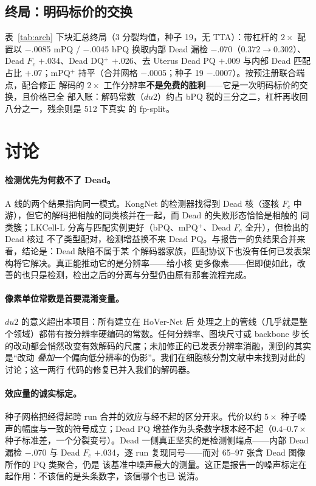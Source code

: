 \documentclass[11pt]{article}
\begin{document}
\subsection{终局：明码标价的交换}
\label{sec:final}

表~\ref{tab:arch} 下块汇总终局（3 分裂均值，种子 19，无 TTA）：带杠杆的 $2\times$ 配置以
$-$.0085 mPQ / $-$.0045 bPQ 换取内部 Dead 漏检 $-$.070（$0.372\!\to\!0.302$）、Dead
$F_c$ $+$.034、Dead DQ$^+$ $+$.026、去 Uterus Dead PQ $+$.009 与内部 Dead 匹配占比
$+$.07；mPQ$^+$ 持平（合并网格 $-$.0005；种子 19 $-$.0007）。按预注册联合端点，配合修正
解码的 $2\times$ 工作分辨率\textbf{不是免费的胜利}——它是一次明码标价的交换，且价格已全
部入账：解码常数（$du2$）约占 bPQ 税的三分之二，杠杆再收回八分之一，残余则是 512 下真实
的 fp-split。

\section{讨论}
\label{sec:discussion}

\paragraph{检测优先为何救不了 Dead。}A 线的两个结果指向同一模式。KongNet 的检测器找得到 Dead
核（逐核 $F_c$ 中游），但它的解码把相触的同类核并在一起，而 Dead 的失败形态恰恰是相触的
同类簇；LKCell-L 分离与匹配实例更好（bPQ、mPQ$^+$、Dead $F_c$ 全升），但检出的 Dead 核过
不了类型配对，检测增益换不来 Dead PQ。与报告一的负结果合并来看，结论是：Dead 缺陷不属于某
个解码器家族，匹配协议下也没有任何已发表架构将它解决。真正能推动它的是分辨率——给小核
更多像素——但即便如此，改善的也只是检测，检出之后的分离与分型仍由原有那套流程完成。

\paragraph{像素单位常数是首要混淆变量。}$du2$ 的意义超出本项目：所有建立在 HoVer-Net 后
处理之上的管线（几乎就是整个领域）都带有按分辨率硬编码的常数。任何分辨率、图块尺寸或
backbone 步长的改动都会悄然改变有效解码的尺度；未加修正的已发表分辨率消融，测到的其实是“改动
\emph{叠加}一个偏向低分辨率的伪影”。我们在细胞核分割文献中未找到对此的讨论；这一两行
代码的修复已并入我们的解码器。

\paragraph{效应量的诚实标定。}种子网格把经得起跨 run 合并的效应与经不起的区分开来。代价以约
$5\times$ 种子噪声的幅度与一致的符号成立；Dead PQ 增益作为头条数字根本经不起（$0.4$--$0.7\times$
种子标准差，一个分裂变号）。Dead 一侧真正坚实的是检测侧端点——内部 Dead 漏检 $-$.070
与 Dead $F_c$ $+$.034，逐 run 复现同号——而对 65--97 张含 Dead 图像所作的 PQ 类聚合，仍是
该基准中噪声最大的测量。这正是报告一的噪声标定在起作用：不该信的是头条数字，该信哪个也已
说清。
\end{document}
